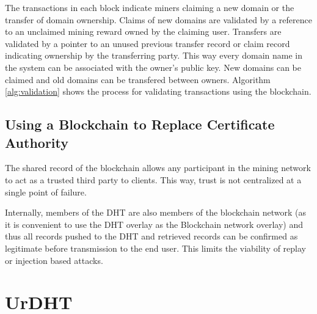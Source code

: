 \documentclass[11pt]{IEEEtran} %
\begin{document}
The transactions in each block indicate miners claiming a new domain or the transfer of domain ownership. Claims of new domains are validated by a reference to an unclaimed mining reward owned by the claiming user. Transfers are validated by a pointer to an unused previous transfer record or claim record indicating ownership by the transferring party. This way every domain name in the system can be associated with the owner's public key. New domains can be claimed and old domains can be transfered between owners.
Algorithm \ref{alg:validation} shows the process for validating transactions using the blockchain.







\subsection{Using a Blockchain to Replace Certificate Authority}
The shared record of the blockchain allows any participant in the mining network to act as a trusted third party to clients. This way, trust is not centralized at a single point of failure. 

Internally, members of the DHT are also members of the blockchain network (as it is convenient to use the DHT overlay as the Blockchain network overlay) and thus all records pushed to the DHT and retrieved records can be confirmed as legitimate before transmission to the end user. This limits the viability of replay or injection based attacks.




\section{UrDHT}
\end{document}
